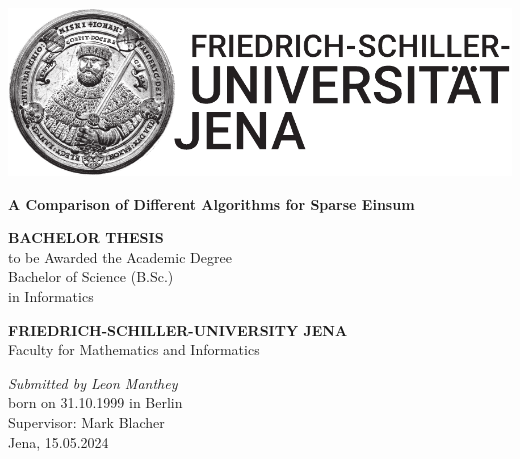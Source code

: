 \documentclass[12pt]{scrbook}
\begin{document}
\begin{titlepage}
    \begin{center}

        \begin{spacing}{1.5}
            \includegraphics[scale=0.9]{Bildmarke_black_15cm-eps-converted-to.pdf}
            \vspace*{\fill}
        \end{spacing}
        \begin{spacing}{2.5}
            \textbf{\huge A Comparison of Different Algorithms for Sparse Einsum}\\[0.5cm]
            \vspace*{\fill}
            \begin{spacing}{1.5}
                \textbf{BACHELOR THESIS\\}
                to be Awarded the Academic Degree\\
                Bachelor of Science (B.Sc.)\\
                in Informatics\\
            \end{spacing}
        \end{spacing}

        \vspace*{\fill}

        \begin{spacing}{1.15}
            \textbf{FRIEDRICH-SCHILLER-UNIVERSITY JENA\\}
            Faculty for Mathematics and Informatics

            \vspace*{\fill}

            \textit{Submitted by Leon Manthey}\\
            born on 31.10.1999 in Berlin\\
            Supervisor: Mark Blacher\\
            Jena, 15.05.2024

        \end{spacing}
    \end{center}
\end{titlepage}
\cleardoublepage
\end{document}
